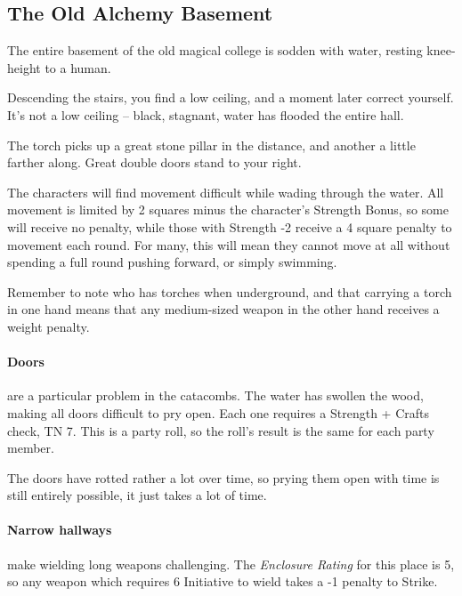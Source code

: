 \begin{multicols}{2}
\forestpriest

\subsection{The Old Alchemy Basement}\label{old_alchemy_basement}\setcounter{list}{0}

The entire basement of the old magical college is sodden with water, resting knee-height to a human.

\begin{boxtext}
	Descending the stairs, you find a low ceiling, and a moment later correct yourself.  It's not a low ceiling -- black, stagnant, water has flooded the entire hall.

	The torch picks up a great stone pillar in the distance, and another a little farther along.  Great double doors stand to your right.

\end{boxtext}

The characters will find movement difficult while wading through the water.  All movement is limited by 2 squares minus the character's Strength Bonus, so some will receive no penalty, while those with Strength -2 receive a 4 square penalty to movement each round.  For many, this will mean they cannot move at all without spending a full round pushing forward, or simply swimming.

Remember to note who has torches when underground, and that carrying a torch in one hand means that any medium-sized weapon in the other hand receives a weight penalty.

\paragraph{Doors} are a particular problem in the catacombs.  The water has swollen the wood, making all doors difficult to pry open.  Each one requires a Strength + Crafts check, TN 7.  This is a party roll, so the roll's result is the same for each party member.

The doors have rotted rather a lot over time, so prying them open with time is still entirely possible, it just takes a lot of time.

\paragraph{Narrow hallways}
make wielding long weapons challenging.
The \textit{Enclosure Rating} for this place is 5, so any weapon which requires 6 Initiative to wield takes a -1 penalty to Strike.


\end{multicols}
